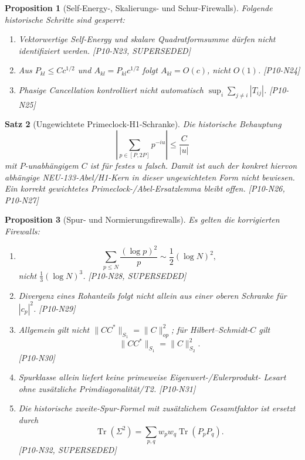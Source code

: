 \documentclass[11pt,a4paper]{amsart}
\newtheorem{theorem}{Satz}[section]
\newtheorem{proposition}[theorem]{Proposition}
\begin{document}
\begin{proposition}[Self-Energy-, Skalierungs- und Schur-Firewalls]
\label{prop:n23n25}
Folgende historische Schritte sind gesperrt:
\begin{enumerate}
  \item Vektorwertige Self-Energy und skalare Quadratformsumme dürfen nicht
        identifiziert werden. \emph{[P10-N23, SUPERSEDED]}
  \item Aus $P_{kl}\le Cc^{1/2}$ und $A_{kl}=P_{kl}c^{1/2}$ folgt
        $A_{kl}=O(c)$, nicht $O(1)$. \emph{[P10-N24]}
  \item Phasige Cancellation kontrolliert nicht automatisch
        $\sup_i\sum_{j\ne i}|T_{ij}|$. \emph{[P10-N25]}
\end{enumerate}
\end{proposition}

\begin{theorem}[Ungewichtete Primeclock-H1-Schranke]
\label{thm:n26n27}
Die historische Behauptung
\[
  \left|\sum_{p\in[P,2P]}p^{-iu}\right|\le\frac{C}{|u|}
\]
mit $P$-unabhängigem $C$ ist für festes $u$ falsch. Damit ist auch der konkret
hiervon abhängige NEU-133-Abel/H1-Kern in dieser ungewichteten Form nicht
bewiesen. Ein korrekt gewichtetes Primeclock-/Abel-Ersatzlemma bleibt offen.
\emph{[P10-N26, P10-N27]}
\end{theorem}

\begin{proposition}[Spur- und Normierungsfirewalls]\label{prop:n28n32}
Es gelten die korrigierten Firewalls:
\begin{enumerate}
  \item
  \[
    \sum_{p\le N}\frac{(\log p)^2}{p}
    \sim\frac12(\log N)^2,
  \]
  nicht $\frac13(\log N)^3$. \emph{[P10-N28, SUPERSEDED]}
  \item Divergenz eines Rohanteils folgt nicht allein aus einer oberen
        Schranke für $|c_p|^2$. \emph{[P10-N29]}
  \item Allgemein gilt nicht $\|CC^*\|_{S_1}=\|C\|_{op}^2$; für
        Hilbert--Schmidt-$C$ gilt
        \[
          \|CC^*\|_{S_1}=\|C\|_{S_2}^2.
        \]
        \emph{[P10-N30]}
  \item Spurklasse allein liefert keine primeweise Eigenwert-/Eulerprodukt-
        Lesart ohne zusätzliche Primdiagonalität/T2. \emph{[P10-N31]}
  \item Die historische zweite-Spur-Formel mit zusätzlichem Gesamtfaktor ist
        ersetzt durch
        \[
          \operatorname{Tr}(\Sigma^2)
          =\sum_{p,q}w_pw_q\operatorname{Tr}(P_pP_q).
        \]
        \emph{[P10-N32, SUPERSEDED]}
\end{enumerate}
\end{proposition}
\end{document}
